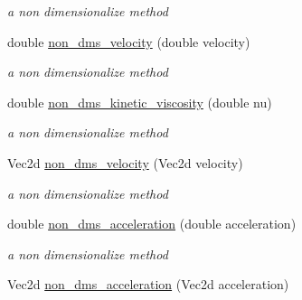 \begin{CompactItemize}
\begin{CompactList}\small\item\em a non dimensionalize method \item\end{CompactList}\item 
\hypertarget{classInitiation_7e4fbcccd66df50f14970074038c2988}{
double \hyperlink{classInitiation_7e4fbcccd66df50f14970074038c2988}{non\_\-dms\_\-velocity} (double velocity)}
\label{classInitiation_7e4fbcccd66df50f14970074038c2988}

\begin{CompactList}\small\item\em a non dimensionalize method \item\end{CompactList}\item 
\hypertarget{classInitiation_f48f16aceb256dd582f8697f21408322}{
double \hyperlink{classInitiation_f48f16aceb256dd582f8697f21408322}{non\_\-dms\_\-kinetic\_\-viscosity} (double nu)}
\label{classInitiation_f48f16aceb256dd582f8697f21408322}

\begin{CompactList}\small\item\em a non dimensionalize method \item\end{CompactList}\item 
\hypertarget{classInitiation_32f485a6951b34ce75bac6422419ebce}{
Vec2d \hyperlink{classInitiation_32f485a6951b34ce75bac6422419ebce}{non\_\-dms\_\-velocity} (Vec2d velocity)}
\label{classInitiation_32f485a6951b34ce75bac6422419ebce}

\begin{CompactList}\small\item\em a non dimensionalize method \item\end{CompactList}\item 
\hypertarget{classInitiation_cc810254f426d6f2ed61ef6edee27d89}{
double \hyperlink{classInitiation_cc810254f426d6f2ed61ef6edee27d89}{non\_\-dms\_\-acceleration} (double acceleration)}
\label{classInitiation_cc810254f426d6f2ed61ef6edee27d89}

\begin{CompactList}\small\item\em a non dimensionalize method \item\end{CompactList}\item 
\hypertarget{classInitiation_68c764e4253f4cc5b66c8e978ef37fc8}{
Vec2d \hyperlink{classInitiation_68c764e4253f4cc5b66c8e978ef37fc8}{non\_\-dms\_\-acceleration} (Vec2d acceleration)}
\label{classInitiation_68c764e4253f4cc5b66c8e978ef37fc8}


\end{CompactItemize}
